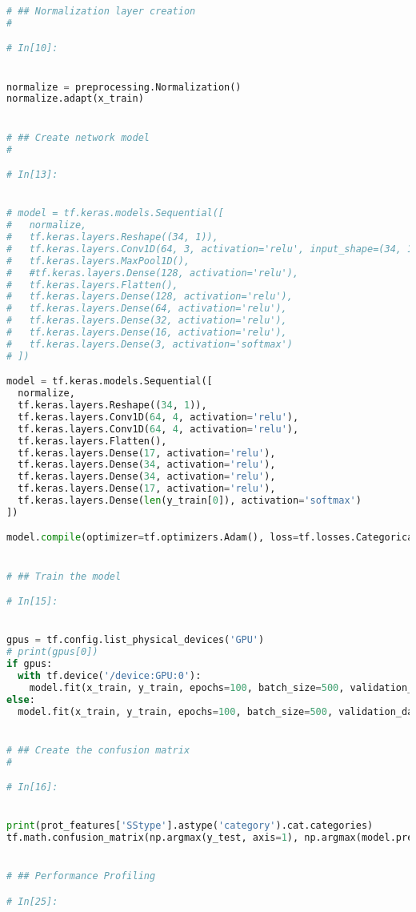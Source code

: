 \documentclass[12pt,letterpaper,oneside,reqno]{book}
\theoremstyle{plain}
\theoremstyle{definition}
\theoremstyle{plain}
\theoremstyle{remark}
\theoremstyle{plain}
\theoremstyle{definition}
\theoremstyle{plain}
\begin{document}
\begin{appendices}
\begin{lstlisting}[language=Python, label=lst:3classdcnnfull, frame=single]
# ## Normalization layer creation
# 

# In[10]:


normalize = preprocessing.Normalization()
normalize.adapt(x_train)


# ## Create network model
# 

# In[13]:


# model = tf.keras.models.Sequential([
#   normalize,
#   tf.keras.layers.Reshape((34, 1)),
#   tf.keras.layers.Conv1D(64, 3, activation='relu', input_shape=(34, 1)),
#   tf.keras.layers.MaxPool1D(),
#   #tf.keras.layers.Dense(128, activation='relu'),
#   tf.keras.layers.Flatten(),
#   tf.keras.layers.Dense(128, activation='relu'),
#   tf.keras.layers.Dense(64, activation='relu'),
#   tf.keras.layers.Dense(32, activation='relu'),
#   tf.keras.layers.Dense(16, activation='relu'),
#   tf.keras.layers.Dense(3, activation='softmax')
# ])

model = tf.keras.models.Sequential([
  normalize,
  tf.keras.layers.Reshape((34, 1)),
  tf.keras.layers.Conv1D(64, 4, activation='relu'),
  tf.keras.layers.Conv1D(64, 4, activation='relu'),
  tf.keras.layers.Flatten(),
  tf.keras.layers.Dense(17, activation='relu'),
  tf.keras.layers.Dense(34, activation='relu'),
  tf.keras.layers.Dense(34, activation='relu'),
  tf.keras.layers.Dense(17, activation='relu'),
  tf.keras.layers.Dense(len(y_train[0]), activation='softmax')
])

model.compile(optimizer=tf.optimizers.Adam(), loss=tf.losses.CategoricalCrossentropy(), metrics=['categorical_accuracy'])


# ## Train the model

# In[15]:


gpus = tf.config.list_physical_devices('GPU')
# print(gpus[0])
if gpus:
  with tf.device('/device:GPU:0'):
    model.fit(x_train, y_train, epochs=100, batch_size=500, validation_data=(x_val, y_val), callbacks=[tf.keras.callbacks.EarlyStopping(patience = 4)])
else:
  model.fit(x_train, y_train, epochs=100, batch_size=500, validation_data=(x_val, y_val), callbacks=[tf.keras.callbacks.EarlyStopping(patience = 4)])


# ## Create the confusion matrix
# 

# In[16]:


print(prot_features['SStype'].astype('category').cat.categories)
tf.math.confusion_matrix(np.argmax(y_test, axis=1), np.argmax(model.predict(x_test), axis=1))


# ## Performance Profiling

# In[25]:



\end{lstlisting}
\end{appendices}
\end{document}
